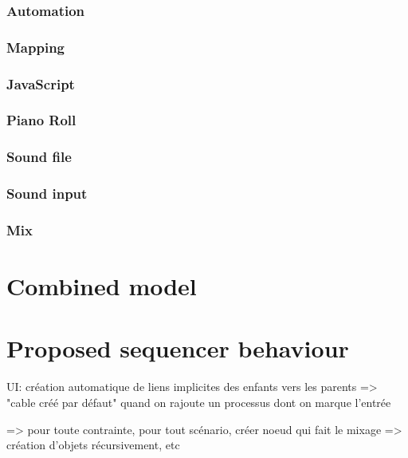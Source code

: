 \documentclass[applsci,article,submit,moreauthors,pdftex,10pt,a4paper]{mdpi}
\begin{document}
\subsubsection{Automation}
\subsubsection{Mapping}
\subsubsection{JavaScript}
\subsubsection{Piano Roll}
\subsubsection{Sound file}
\subsubsection{Sound input}
\subsubsection{Mix}


\section{Combined model}
\subsection{}

\section{Proposed sequencer behaviour}
UI: création automatique de liens implicites des enfants vers les parents
=> "cable créé par défaut" quand on rajoute un processus dont on marque l'entrée

=> pour toute contrainte, pour tout scénario, créer noeud qui fait le mixage
=> création d'objets récursivement, etc
\end{document}
